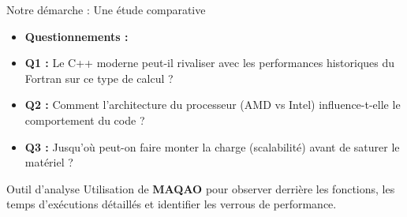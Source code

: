\begin{frame}{Notre démarche : Une étude comparative}
    \begin{itemize}
        \item \textbf{Questionnements :}
        \item \textbf{Q1 :} Le C++ moderne peut-il rivaliser avec les performances historiques du Fortran sur ce type de calcul ?
        \item \textbf{Q2 :} Comment l'architecture du processeur (AMD vs Intel) influence-t-elle le comportement du code ?
        \item \textbf{Q3 :} Jusqu'où peut-on faire monter la charge (scalabilité) avant de saturer le matériel ?
    \end{itemize}
    \vspace{0.5cm}
    \begin{block}{Outil d'analyse}
        Utilisation de \textbf{MAQAO} pour observer derrière les fonctions, les temps d'exécutions détaillés et identifier les verrous de performance.
    \end{block}
\end{frame}